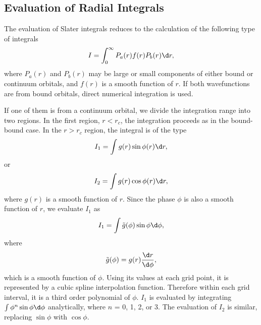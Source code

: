 \documentclass{elsart}
\begin{document}
\subsection{Evaluation of Radial Integrals}
The evaluation of Slater integrals reduces to the calculation of the following
type of integrals 
\begin{equation}
I = \int_0^\infty P_a(r)f(r)P_b(r)\d r,
\end{equation}
where $P_a(r)$ and $P_b(r)$ may be large or small components of either bound
or continuum orbitals, and $f(r)$ is a smooth function of $r$. If both
wavefunctions are from bound orbitals, direct numerical integration is
used. 

If one of them is from a continuum orbital, we divide the integration
range into two regions. In the first region, $r < r_c$, the integration
proceeds as in the bound-bound case. In the $r > r_c$ region, the integral is
of the type 
\begin{equation}
I_1 = \int g(r)\sin\phi(r) \d r ,
\end{equation}
or 
\begin{equation}
I_2 = \int g(r)\cos\phi(r) \d r ,
\end{equation}
where $g(r)$ is a smooth function of $r$. Since the phase $\phi$ is also a
smooth function of $r$, we evaluate $I_1$ as
\begin{equation}
I_1 = \int \tilde{g}(\phi)\sin\phi \d\phi,
\end{equation}
where 
\begin{equation}
\tilde{g}(\phi) = g(r)\frac{\d r}{\d\phi},
\end{equation}
which is a smooth function of $\phi$. Using its values at each grid point, it
is represented by a cubic spline interpolation function. Therefore within each
grid interval, it is a third order polynomial of $\phi$. $I_1$ is evaluated by
integrating $\int \phi^n\sin\phi\d\phi$ analytically, where $n$ = 0, 1, 2, or
3.  The evaluation of $I_2$ is similar, replacing $\sin\phi$ with $\cos\phi$. 
\end{document}

